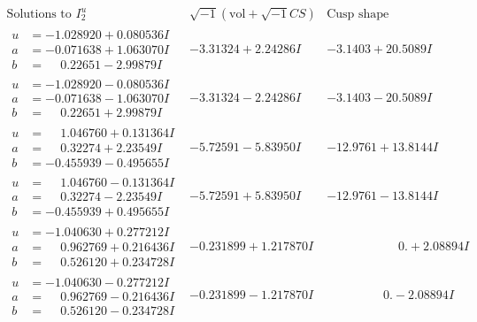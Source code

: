 \documentclass[1p]{elsarticle_modified}
\theoremstyle{definition}
\newcommand{\I}{\sqrt{-1}}
\begin{document}
$$\begin{array}{c|c|c}  
\text{Solutions to }I^u_{2}& \I (\text{vol} + \sqrt{-1}CS) & \text{Cusp shape}\\
 \hline 
\begin{aligned}
u &= -1.028920 + 0.080536 I \\
a &= -0.071638 + 1.063070 I \\
b &= \phantom{-}0.22651 - 2.99879 I\end{aligned}
 & -3.31324 + 2.24286 I & -3.1403 + 20.5089 I \\ \hline\begin{aligned}
u &= -1.028920 - 0.080536 I \\
a &= -0.071638 - 1.063070 I \\
b &= \phantom{-}0.22651 + 2.99879 I\end{aligned}
 & -3.31324 - 2.24286 I & -3.1403 - 20.5089 I \\ \hline\begin{aligned}
u &= \phantom{-}1.046760 + 0.131364 I \\
a &= \phantom{-}0.32274 + 2.23549 I \\
b &= -0.455939 - 0.495655 I\end{aligned}
 & -5.72591 - 5.83950 I & -12.9761 + 13.8144 I \\ \hline\begin{aligned}
u &= \phantom{-}1.046760 - 0.131364 I \\
a &= \phantom{-}0.32274 - 2.23549 I \\
b &= -0.455939 + 0.495655 I\end{aligned}
 & -5.72591 + 5.83950 I & -12.9761 - 13.8144 I \\ \hline\begin{aligned}
u &= -1.040630 + 0.277212 I \\
a &= \phantom{-}0.962769 + 0.216436 I \\
b &= \phantom{-}0.526120 + 0.234728 I\end{aligned}
 & -0.231899 + 1.217870 I & \phantom{-0.000000 -}0. + 2.08894 I \\ \hline\begin{aligned}
u &= -1.040630 - 0.277212 I \\
a &= \phantom{-}0.962769 - 0.216436 I \\
b &= \phantom{-}0.526120 - 0.234728 I\end{aligned}
 & -0.231899 - 1.217870 I & \phantom{-0.000000 } 0. - 2.08894 I \\ \hline\begin{aligned}

\end{aligned}
\end{array}$$
\end{document}
